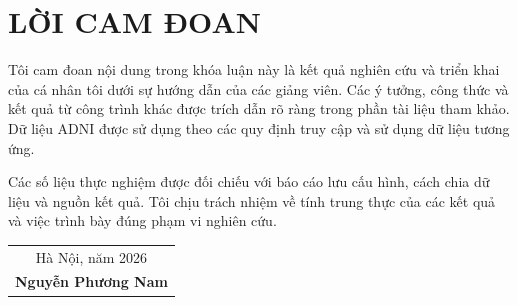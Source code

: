 \chapter*{LỜI CAM ĐOAN}

Tôi cam đoan nội dung trong khóa luận này là kết quả nghiên cứu và triển khai của cá nhân tôi dưới sự hướng dẫn của các giảng viên. Các ý tưởng, công thức và kết quả từ công trình khác được trích dẫn rõ ràng trong phần tài liệu tham khảo. Dữ liệu ADNI được sử dụng theo các quy định truy cập và sử dụng dữ liệu tương ứng.

Các số liệu thực nghiệm được đối chiếu với báo cáo lưu cấu hình, cách chia dữ liệu và nguồn kết quả. Tôi chịu trách nhiệm về tính trung thực của các kết quả và việc trình bày đúng phạm vi nghiên cứu.

\vspace{1.5cm}
\begin{flushright}
\begin{tabular}{@{}c@{}}
Hà Nội, năm 2026\\[1.5cm]
\textbf{Nguyễn Phương Nam}
\end{tabular}
\end{flushright}
